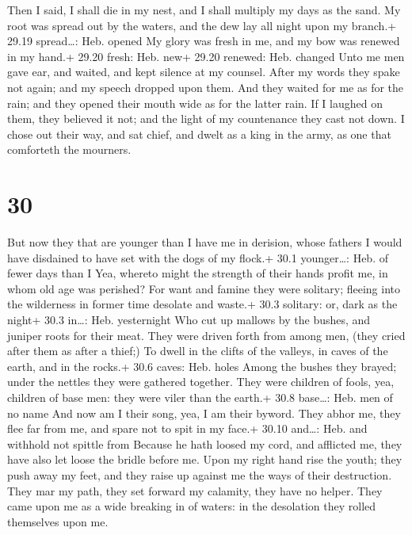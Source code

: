  Then I said, I shall die in my nest, and I shall multiply
my days as the sand.  My root was spread out by the waters,
and the dew lay all night upon my branch.+ 29.19 spread\ldots: Heb.
opened  My glory was fresh in me, and my bow was renewed in
my hand.+ 29.20 fresh: Heb. new+ 29.20 renewed: Heb. changed
 Unto me men gave ear, and waited, and kept silence at my
counsel.  After my words they spake not again; and my
speech dropped upon them.  And they waited for me as for
the rain; and they opened their mouth wide as for the latter rain.
 If I laughed on them, they believed it not; and the light
of my countenance they cast not down.  I chose out their
way, and sat chief, and dwelt as a king in the army, as one that
comforteth the mourners.

\hypertarget{section-29}{%
\section{30}\label{section-29}}

 But now they that are younger than I have me in derision,
whose fathers I would have disdained to have set with the dogs of my
flock.+ 30.1 younger\ldots: Heb. of fewer days than I  Yea,
whereto might the strength of their hands profit me, in whom old age was
perished?  For want and famine they were solitary; fleeing
into the wilderness in former time desolate and waste.+ 30.3 solitary:
or, dark as the night+ 30.3 in\ldots: Heb. yesternight  Who
cut up mallows by the bushes, and juniper roots for their meat.
 They were driven forth from among men, (they cried after
them as after a thief;)  To dwell in the clifts of the
valleys, in caves of the earth, and in the rocks.+ 30.6 caves: Heb.
holes  Among the bushes they brayed; under the nettles they
were gathered together.  They were children of fools, yea,
children of base men: they were viler than the earth.+ 30.8 base\ldots:
Heb. men of no name  And now am I their song, yea, I am
their byword.  They abhor me, they flee far from me, and
spare not to spit in my face.+ 30.10 and\ldots: Heb. and withhold not
spittle from  Because he hath loosed my cord, and afflicted
me, they have also let loose the bridle before me.  Upon my
right hand rise the youth; they push away my feet, and they raise up
against me the ways of their destruction.  They mar my
path, they set forward my calamity, they have no helper. 
They came upon me as a wide breaking in of waters: in the desolation
they rolled themselves upon me.


